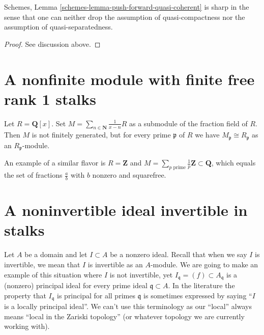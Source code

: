 \begin{lemma}
\label{lemma-pushforward-quasi-coherent}
Schemes, Lemma \ref{schemes-lemma-push-forward-quasi-coherent}
is sharp in the sense that one can neither drop the assumption
of quasi-compactness nor the assumption of quasi-separatedness.
\end{lemma}

\begin{proof}
See discussion above.
\end{proof}








\section{A nonfinite module with finite free rank 1 stalks}
\label{section-nonfree}

\noindent
Let $R = \mathbf{Q}[x]$. Set
$M = \sum_{n \in \mathbf{N}} \frac{1}{x - n}R$ as a submodule of
the fraction field of $R$. Then $M$ is not finitely generated, but
for every prime $\mathfrak p$ of $R$ we have
$M_{\mathfrak p} \cong R_{\mathfrak p}$ as an
$R_{\mathfrak p}$-module.

\medskip\noindent
An example of a similar flavor is $R = \mathbf{Z}$ and
$M = \sum_{p \text{ prime}} \frac{1}{p} \mathbf{Z} \subset \mathbf{Q}$,
which equals the set of fractions $\frac{a}{b}$ with $b$ nonzero and
squarefree.








\section{A noninvertible ideal invertible in stalks}
\label{section-locally-invertible-not-invertible}

\noindent
Let $A$ be a domain and let $I \subset A$ be a nonzero ideal.
Recall that when we say $I$ is invertible, we mean that
$I$ is invertible as an $A$-module.
We are going to make an example of this situation where
$I$ is not invertible, yet $I_\mathfrak q = (f) \subset A_\mathfrak q$
is a (nonzero) principal ideal for every prime ideal $\mathfrak q \subset A$.
In the literature the property that $I_\mathfrak q$ is principal
for all primes $\mathfrak q$ is sometimes expressed by
saying ``$I$ is a locally principal ideal''. We can't use
this terminology as our ``local'' always means
``local in the Zariski topology'' (or whatever topology we are
currently working with).


